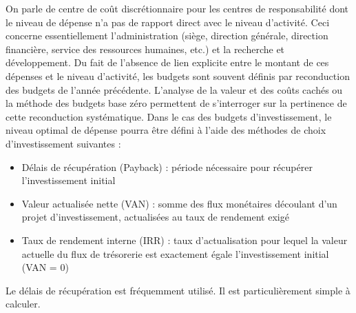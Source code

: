 \documentclass[oneside]{kaobook}
\begin{document}
On parle de centre de coût discrétionnaire pour les centres de responsabilité dont le niveau de dépense n'a pas de rapport direct avec le niveau d'activité. Ceci concerne essentiellement l'administration (siège, direction générale, direction financière, service des ressources humaines, etc.) et la recherche et développement. 
Du fait de l'absence de lien explicite entre le montant de ces dépenses et le niveau d'activité, les budgets sont souvent définis par reconduction des budgets de l'année précédente. L'analyse de la valeur et des coûts cachés ou la méthode des budgets base zéro permettent de s'interroger sur la pertinence de cette reconduction systématique. 
Dans le cas des budgets d'investissement, le niveau optimal de dépense pourra être défini à l'aide des méthodes de choix d'investissement suivantes :
\begin{itemize}
\item Délais de récupération (Payback) : période nécessaire pour récupérer l'investissement initial
\item Valeur actualisée nette (VAN) : somme des flux monétaires découlant d’un projet d’investissement, actualisées au taux de rendement exigé
\item Taux de rendement interne (IRR) : taux d’actualisation  pour lequel la valeur actuelle du flux de trésorerie est exactement égale l'investissement initial  (VAN  = 0)
\end{itemize}

Le délais de récupération est fréquemment utilisé. Il est particulièrement simple à calculer.
\end{document}
